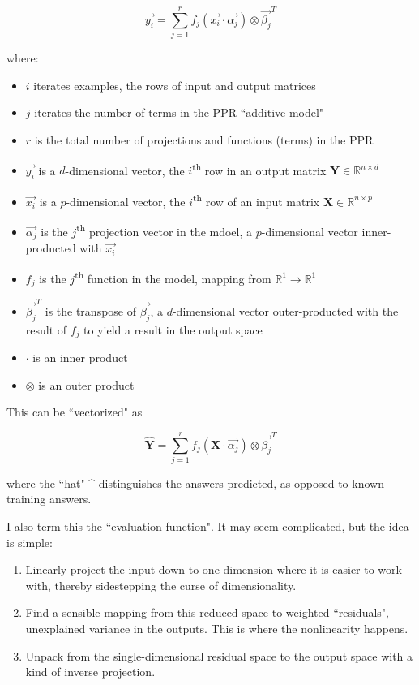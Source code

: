 \documentclass[12pt]{article}
\begin{document}
$$\vec{y_i} = \sum_{j=1}^{r} f_j(\vec{x_i} \cdot \vec{\alpha_j}) \otimes \vec{\beta_j}^T$$

where:
\begin{itemize}
	\setlength\itemsep{-2mm}
	\item $i$ iterates examples, the rows of input and output matrices
	\item $j$ iterates the number of terms in the PPR ``additive model"
	\item $r$ is the total number of projections and functions (terms) in the PPR
	\item $\vec{y_i}$ is a $d$-dimensional vector, the $i$\textsuperscript{th} row in an output matrix $\pmb{Y} \in \mathbb{R}^{n \times d}$
	\item $\vec{x_i}$ is a $p$-dimensional vector, the $i$\textsuperscript{th} row of an input matrix $\pmb{X} \in \mathbb{R}^{n \times p}$
	\item $\vec{\alpha_j}$ is the $j$\textsuperscript{th} projection vector in the mdoel, a $p$-dimensional vector inner-producted with $\vec{x_i}$
	\item $f_j$ is the $j$\textsuperscript{th} function in the model, mapping from $\mathbb{R}^1 \rightarrow \mathbb{R}^1$
	\item $\vec{\beta_j}^T$ is the transpose of $\vec{\beta_j}$, a $d$-dimensional vector outer-producted with the result of $f_j$ to yield a result in the output space
	\item $\cdot$ is an inner product
	\item $\otimes$ is an outer product
\end{itemize}

This can be ``vectorized" as

$$\pmb{\hat{Y}} = \sum_{j=1}^r f_j(\pmb{X} \cdot \vec{\alpha_j}) \otimes \vec{\beta_j}^T$$

where the ``hat" \string^ distinguishes the answers predicted, as opposed to known training answers.\newline

I also term this the ``evaluation function". It may seem complicated, but the idea is simple:

\begin{enumerate}
	\setlength\itemsep{-2mm}
	\item Linearly project the input down to one dimension where it is easier to work with, thereby sidestepping the curse of dimensionality.
	\item Find a sensible mapping from this reduced space to weighted ``residuals", unexplained variance in the outputs. This is where the nonlinearity happens.
	\item Unpack from the single-dimensional residual space to the output space with a kind of inverse projection.
\end{enumerate}
\end{document}
